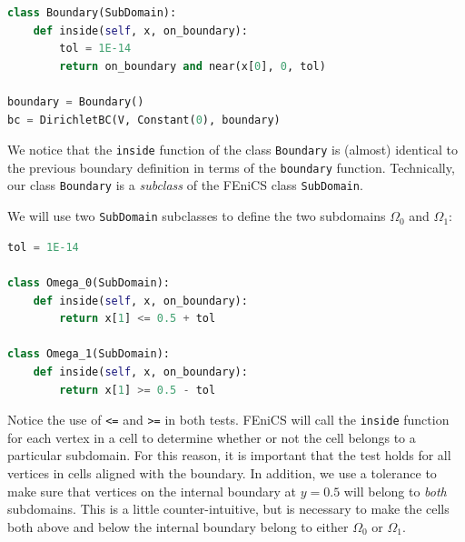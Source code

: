 \documentclass[graybox,envcountchap,sectrefs,final]{svmonodo}
\begin{document}
\begin{lstlisting}[language=Python,style=graycolor]
class Boundary(SubDomain):
    def inside(self, x, on_boundary):
        tol = 1E-14
        return on_boundary and near(x[0], 0, tol)

boundary = Boundary()
bc = DirichletBC(V, Constant(0), boundary)
\end{lstlisting}
We notice that the \texttt{inside} function of the class \texttt{Boundary} is
(almost) identical to the previous boundary definition in terms of the
\texttt{boundary} function. Technically, our class \texttt{Boundary} is a
\emph{subclass} of the FEniCS class \texttt{SubDomain}.


We will use two \texttt{SubDomain} subclasses to define the two subdomains
$\Omega_0$ and $\Omega_1$:

\begin{lstlisting}[language=Python,style=graycolor]
tol = 1E-14

class Omega_0(SubDomain):
    def inside(self, x, on_boundary):
        return x[1] <= 0.5 + tol

class Omega_1(SubDomain):
    def inside(self, x, on_boundary):
        return x[1] >= 0.5 - tol
\end{lstlisting}
Notice the use of \texttt{<=} and \texttt{>=} in both tests. FEniCS will call the
\texttt{inside} function for each vertex in a cell to determine whether or
not the cell belongs to a particular subdomain. For this reason, it is
important that the test holds for all vertices in cells aligned with
the boundary. In addition, we use a tolerance to make sure that
vertices on the internal boundary at $y = 0.5$ will belong to \emph{both}
subdomains. This is a little counter-intuitive, but is necessary to
make the cells both above and below the internal boundary belong to
either $\Omega_0$ or $\Omega_1$.
\end{document}
